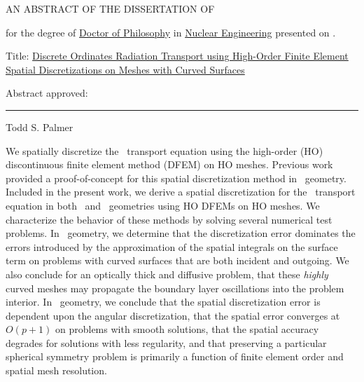 \documentclass[12pt]{article}
\begin{document}
\begin{singlespace}

\begin{center}
AN ABSTRACT OF THE DISSERTATION OF
\end{center}

\vspace{12pt}

\noindent
\uline{\ThesisAuthor} for the degree of \uline{Doctor of Philosophy} in \uline{Nuclear Engineering} presented on \uline{\DefenseDate}.

\vspace{12pt}

\noindent
Title: \uline{Discrete Ordinates Radiation Transport using High-Order Finite Element Spatial Discretizations on Meshes with Curved Surfaces}

\vspace{12pt}

\noindent
Abstract approved:

\vspace{12pt}

\noindent
\begin{center}
\rule{\textwidth}{0.4pt}

\noindent
Todd S. Palmer
\end{center}

\vspace{12pt}

\end{singlespace}

We spatially discretize the \SN\ transport equation using the high-order (HO) discontinuous finite element method (DFEM) on HO meshes. Previous work provided a proof-of-concept for this spatial discretization method in \XY\ geometry. Included in the present work, we derive a spatial discretization for the \SN\ transport equation in both \XY\ and \RZ\ geometries using HO DFEMs on HO meshes. We characterize the behavior of these methods by solving several numerical test problems. In \XY\ geometry, we determine that the discretization error dominates the errors introduced by the approximation of the spatial integrals on the surface term on problems with curved surfaces that are both incident and outgoing. We also conclude for an optically thick and diffusive problem, that these \emph{highly} curved meshes may propagate the boundary layer oscillations into the problem interior. In \RZ\ geometry, we conclude that the spatial discretization error is dependent upon the angular discretization, that the spatial error converges at $O(p+1)$ on problems with smooth solutions, that the spatial accuracy degrades for solutions with less regularity, and that preserving a particular spherical symmetry problem is primarily a function of finite element order and spatial mesh resolution.
\end{document}
